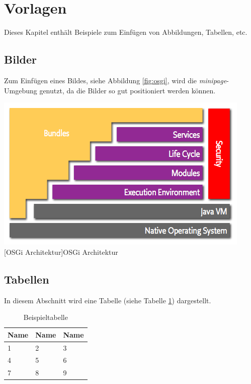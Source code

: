 \documentclass[12pt,a4paper,bibliography=totocnumbered,listof=totoc]{scrartcl}
\begin{document}
\section{Vorlagen}
Dieses Kapitel enthält Beispiele zum Einfügen von Abbildungen, Tabellen, etc.

\subsection{Bilder}
Zum Einfügen eines Bildes, siehe Abbildung \ref{fig:osgi}, wird die \textit{minipage}-Umgebung genutzt, da die Bilder so gut positioniert werden können.

\vspace{1em}
\begin{minipage}{\linewidth}
	\centering
	\includegraphics[width=0.7\linewidth]{Bilder/layering-osgi.png}
	[OSGi Architektur]{OSGi Architektur\footnotemark }
	\label{fig:osgi}
\end{minipage}

\subsection{Tabellen}
In diesem Abschnitt wird eine Tabelle (siehe Tabelle \ref{tab:beispiel}) dargestellt.

\vspace{1em}
\begin{table}[!h]
	\centering
	\begin{tabular}{|l|l|l|}
		\hline
		\textbf{Name} & \textbf{Name} & \textbf{Name}\\
		\hline
		1 & 2 & 3\\
		\hline
		4 & 5 & 6\\
		\hline
		7 & 8 & 9\\
		\hline
	\end{tabular}
	\caption{Beispieltabelle}
	\label{tab:beispiel}
\end{table}
\end{document}
